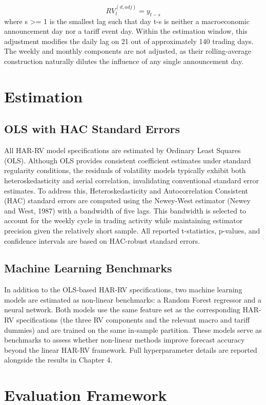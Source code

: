 \documentclass[12pt,a4paper]{report}
\begin{document}
\begin{equation}
RV_t^(d,adj) = y_{t-s}
\end{equation}
where s \textgreater{}= 1 is the smallest lag such that day t-s is neither a macroeconomic announcement day nor a tariff event day. Within the estimation window, this adjustment modifies the daily lag on 21 out of approximately 140 trading days. The weekly and monthly components are not adjusted, as their rolling-average construction naturally dilutes the influence of any single announcement day.

\section{Estimation}
\subsection{OLS with HAC Standard Errors}
All HAR-RV model specifications are estimated by Ordinary Least Squares (OLS). Although OLS provides consistent coefficient estimates under standard regularity conditions, the residuals of volatility models typically exhibit both heteroskedasticity and serial correlation, invalidating conventional standard error estimates. To address this, Heteroskedasticity and Autocorrelation Consistent (HAC) standard errors are computed using the Newey-West estimator (Newey and West, 1987) with a bandwidth of five lags. This bandwidth is selected to account for the weekly cycle in trading activity while maintaining estimator precision given the relatively short sample. All reported t-statistics, p-values, and confidence intervals are based on HAC-robust standard errors.

\subsection{Machine Learning Benchmarks}
In addition to the OLS-based HAR-RV specifications, two machine learning models are estimated as non-linear benchmarks: a Random Forest regressor and a neural network. Both models use the same feature set as the corresponding HAR-RV specifications (the three RV components and the relevant macro and tariff dummies) and are trained on the same in-sample partition. These models serve as benchmarks to assess whether non-linear methods improve forecast accuracy beyond the linear HAR-RV framework. Full hyperparameter details are reported alongside the results in Chapter 4.

\section{Evaluation Framework}
\end{document}
